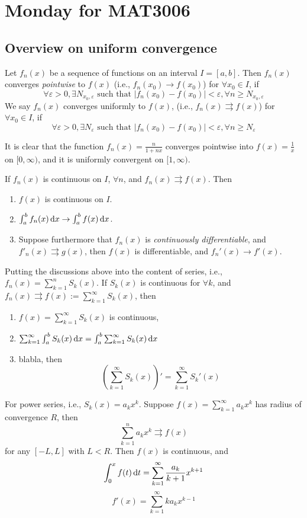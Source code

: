 \section{Monday for MAT3006}
\subsection{Overview on uniform convergence}
\begin{definition}[Convergence]
Let $f_n(x)$ be a sequence of functions on an interval $I=[a,b]$. Then $f_n(x)$ converges \emph{pointwise} to $f(x)$ (i.e., $f_n(x_0)\to f(x_0)$) for $\forall x_0\in I$, if
\[
\forall\varepsilon>0,\exists N_{x_0,\varepsilon}\mbox{ such that }|f_n(x_0)-f(x_0)|<\varepsilon,\forall n\ge N_{x_0,\varepsilon}
\]
We say $f_n(x)$ converges uniformly to $f(x)$, (i.e., $f_n(x)\rightrightarrows f(x)$) for $\forall x_0\in I$, if
\[
\forall\varepsilon>0,\exists N_{\varepsilon}\mbox{ such that }|f_n(x_0)-f(x_0)|<\varepsilon,\forall n\ge N_{\varepsilon}
\]
\end{definition}
\begin{example}
It is clear that 
the function $f_n(x)=\frac{n}{1+nx}$ converges pointwise into $f(x)=\frac{1}{x}$ on $[0,\infty)$, and it is uniformly convergent on $[1,\infty)$.
\end{example}
\begin{proposition}
If $f_n(x)$ is continuous on $I$, $\forall n$, and $f_n(x)\rightrightarrows f(x)$. Then
\begin{enumerate}
\item
$f(x)$ is continuous on $I$.
\item
$\int_a^bf_n(x)\,\mathrm{d} x\to\int_a^bf(x)\,\mathrm{d} x$.
\item
Suppose furthermore that $f_n(x)$ is \emph{continuously differentiable}, and $f'_n(x)\rightrightarrows g(x)$, then $f(x)$ is differentiable, and $f_n'(x)\to f'(x)$.
\end{enumerate}
\end{proposition}
\begin{proposition}
Putting the discussions above into the content of series, i.e., $f_n(x)=\sum_{k=1}^nS_k(x)$. If $S_k(x)$ is continuous for $\forall k$, and $f_n(x)\rightrightarrows f(x):=\sum_{k=1}^\infty S_k(x)$, then
\begin{enumerate}
\item
$f(x)=\sum_{k=1}^\infty S_k(x)$ is continuous,
\item
$\sum_{k=1}^\infty\int_a^bS_k(x)\,\mathrm{d} x=\int_a^b\sum_{k=1}^\infty S_k(x)\,\mathrm{d} x$
\item
blabla, then
\[
\left(\sum_{k=1}^\infty S_k(x)\right)'=\sum_{k=1}^\infty S_k'(x)
\]
\end{enumerate}
\end{proposition}
\begin{proposition}
For power series, i.e., $S_k(x)=a_kx^k$. Suppose $f(x)=\sum_{k=1}^\infty a_kx^k$ has radius of convergence $R$, then 
\[
\sum_{k=1}^na_kx^k\rightrightarrows f(x)
\]
for any $[-L,L]$ with $L<R$. Then $f(x)$ is continuous, and
\[
\int_0^xf(t)\,\mathrm{d} t=\sum_{k=1}^\infty\frac{a_k}{k+1}x^{k+1}
\]
\[
f'(x)=\sum_{k=1}^\infty ka_kx^{k-1}
\]
\end{proposition}
